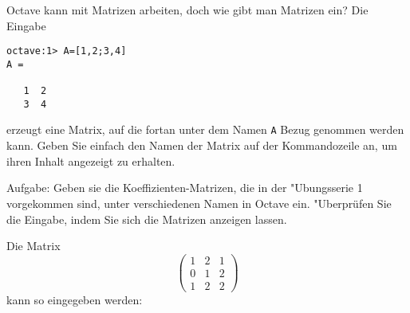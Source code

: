 Octave kann mit Matrizen arbeiten, doch wie gibt man Matrizen ein?
Die Eingabe
\begin{verbatim}
octave:1> A=[1,2;3,4]
A =

   1  2
   3  4
\end{verbatim}
erzeugt eine Matrix, auf die fortan unter dem Namen {\tt A}
Bezug genommen werden kann. Geben Sie einfach den Namen der
Matrix auf der Kommandozeile an, um ihren Inhalt angezeigt zu
erhalten.


Aufgabe: Geben sie die Koeffizienten-Matrizen, die in der "Ubungsserie 1
vorgekommen
sind, unter verschiedenen Namen in Octave ein. "Uberprüfen Sie die
Eingabe, indem Sie sich die Matrizen anzeigen lassen.

\begin{loesung}
Die Matrix
\[
\begin{pmatrix}
1&2&1\\
0&1&2\\
1&2&2
\end{pmatrix}
\]
kann so eingegeben werden:
\end{loesung}

